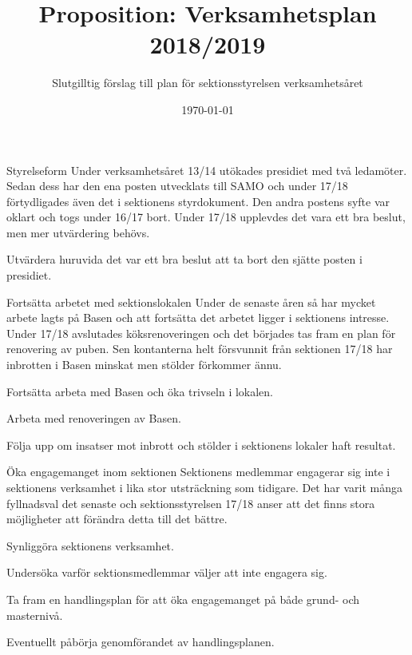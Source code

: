 \documentclass{dtek}
\title{Proposition: Verksamhetsplan 2018/2019}
\subtitle{Slutgilltig förslag till plan för sektionsstyrelsen verksamhetsåret}
\author{}
\date{\today}
\begin{document}
  \makeheadfoot%
  \maketitle

  \begin{FokusPunkt}{Styrelseform}{%
    Under verksamhetsåret 13/14 utökades presidiet med två ledamöter. Sedan
    dess har den ena posten utvecklats till SAMO och under 17/18 förtydligades
    även det i sektionens styrdokument. Den andra postens syfte var oklart och
    togs under 16/17 bort. Under 17/18 upplevdes det vara ett bra beslut, men
    mer utvärdering behövs.
  }
    \item Utvärdera huruvida det var ett bra beslut att ta bort den sjätte
      posten i presidiet.
  \end{FokusPunkt}

  \begin{FokusPunkt}{Fortsätta arbetet med sektionslokalen}{
    Under de senaste åren så har mycket arbete lagts på Basen och att fortsätta
    det arbetet ligger i sektionens intresse. Under 17/18 avslutades
    köksrenoveringen och det börjades tas fram en plan för renovering av puben.
    Sen kontanterna helt försvunnit från sektionen 17/18 har inbrotten i Basen
    minskat men stölder förkommer ännu.
  }
    \item Fortsätta arbeta med Basen och öka trivseln i lokalen.
    \item Arbeta med renoveringen av Basen.
    \item Följa upp om insatser mot inbrott och stölder i sektionens lokaler
      haft resultat.
  \end{FokusPunkt}

  \begin{FokusPunkt}{Öka engagemanget inom sektionen}{
    Sektionens medlemmar engagerar sig inte i sektionens verksamhet i lika stor
    utsträckning som tidigare. Det har varit många fyllnadsval det senaste och
    sektionsstyrelsen 17/18 anser att det finns stora möjligheter att förändra
    detta till det bättre.
  }
    \item Synliggöra sektionens verksamhet.
    \item Undersöka varför sektionsmedlemmar väljer att inte engagera sig.
    \item Ta fram en handlingsplan för att öka engagemanget på både grund- och
      masternivå.
    \item Eventuellt påbörja genomförandet av handlingsplanen.
  \end{FokusPunkt}
\end{document}
